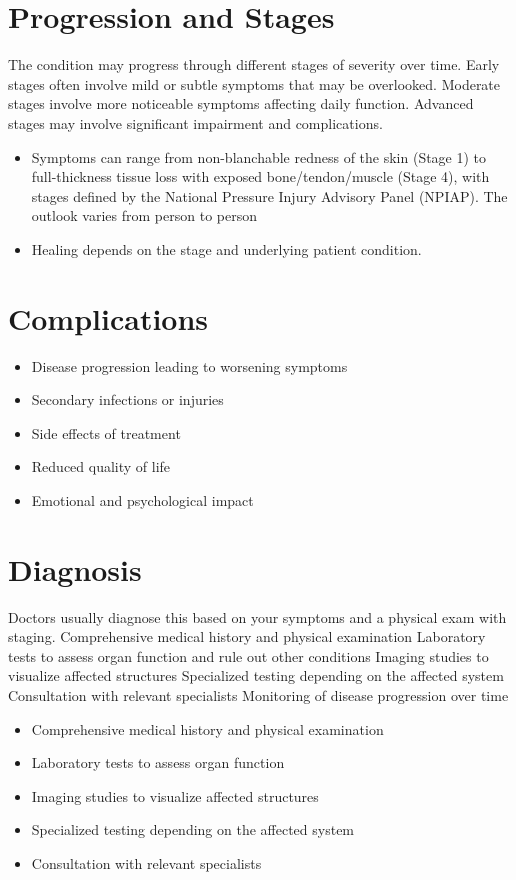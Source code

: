 \section{Progression and Stages}
The condition may progress through different stages of severity over time. Early stages often involve mild or subtle symptoms that may be overlooked. Moderate stages involve more noticeable symptoms affecting daily function. Advanced stages may involve significant impairment and complications.

\begin{itemize}[noitemsep]
  \item Symptoms can range from non-blanchable redness of the skin (Stage 1) to full-thickness tissue loss with exposed bone/tendon/muscle (Stage 4), with stages defined by the National Pressure Injury Advisory Panel (NPIAP). The outlook varies from person to person
  \item Healing depends on the stage and underlying patient condition.
\end{itemize}
\section{Complications}
\begin{itemize}[noitemsep]
  \item Disease progression leading to worsening symptoms
  \item Secondary infections or injuries
  \item Side effects of treatment
  \item Reduced quality of life
  \item Emotional and psychological impact
\end{itemize}
\section{Diagnosis}
Doctors usually diagnose this based on your symptoms and a physical exam with staging. Comprehensive medical history and physical examination Laboratory tests to assess organ function and rule out other conditions Imaging studies to visualize affected structures Specialized testing depending on the affected system Consultation with relevant specialists Monitoring of disease progression over time

\begin{itemize}[noitemsep]
  \item Comprehensive medical history and physical examination
  \item Laboratory tests to assess organ function
  \item Imaging studies to visualize affected structures
  \item Specialized testing depending on the affected system
  \item Consultation with relevant specialists
\end{itemize}
